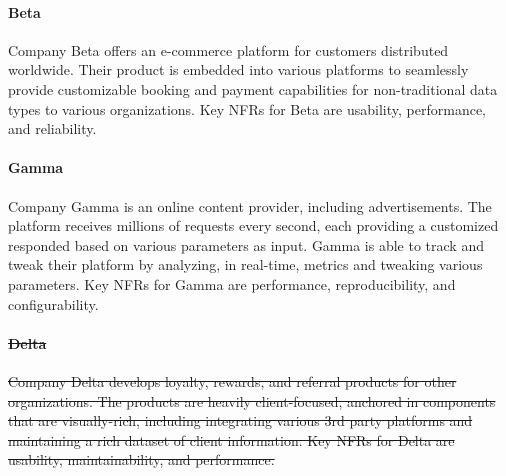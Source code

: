 \documentclass[smallextended]{svjour3}        %
\providecommand{\DIFdeltex}[1]{{\protect\color{red}\sout{#1}}} %
\providecommand{\DIFdelbegin}{} %
\providecommand{\DIFdel}[1]{\texorpdfstring{\DIFdeltex{#1}}{}} %
\newcommand{\DIFscaledelfig}{0.5}
\newlength{\DIFdelgraphicswidth} %
\newlength{\DIFdelgraphicsheight} %
\newcommand{\DIFdelincludegraphics}[2][]{%
\sbox{\DIFdelgraphicsbox}{\DIFOincludegraphics[#1]{#2}}%
\settoboxwidth{\DIFdelgraphicswidth}{\DIFdelgraphicsbox} %
\settoboxtotalheight{\DIFdelgraphicsheight}{\DIFdelgraphicsbox} %
\scalebox{\DIFscaledelfig}{%
\parbox[b]{\DIFdelgraphicswidth}{\usebox{\DIFdelgraphicsbox}\\[-\baselineskip] \rule{\DIFdelgraphicswidth}{0em}}\llap{\resizebox{\DIFdelgraphicswidth}{\DIFdelgraphicsheight}{%
\setlength{\unitlength}{\DIFdelgraphicswidth}%
\begin{picture}(1,1)%
\thicklines\linethickness{2pt} %
{\color[rgb]{1,0,0}\put(0,0){\framebox(1,1){}}}%
{\color[rgb]{1,0,0}\put(0,0){\line( 1,1){1}}}%
{\color[rgb]{1,0,0}\put(0,1){\line(1,-1){1}}}%
\end{picture}%
}\hspace*{3pt}}} %
} %
\DeclareRobustCommand{\DIFdelbegin}{\DIFOdelbegin \let\includegraphics\DIFdelincludegraphics} %
\begin{document}
\paragraph{Beta}
Company Beta offers an e-commerce platform for customers distributed worldwide. Their product is embedded into various platforms to seamlessly provide customizable booking and payment capabilities for non-traditional data types to various organizations. Key NFRs for Beta are usability, performance, and reliability.



\paragraph{Gamma}
Company Gamma is an online content provider, including advertisements. The platform receives millions of requests every second, each providing a customized responded based on various parameters as input. Gamma is able to track and tweak their platform by analyzing, in real-time, metrics and tweaking various parameters. Key NFRs for Gamma are performance, reproducibility, and configurability. 





\DIFdelbegin \paragraph{\DIFdel{Delta}}
\addtocounter{paragraph}{-1}%
\DIFdel{Company Delta develops loyalty, rewards, and referral products for other organizations. The products are heavily client-focused, anchored in components that are visually-rich, including integrating various 3rd party platforms and maintaining a rich dataset of client information. Key NFRs for Delta are usability, maintainability, and performance. 
}%
\end{document}
